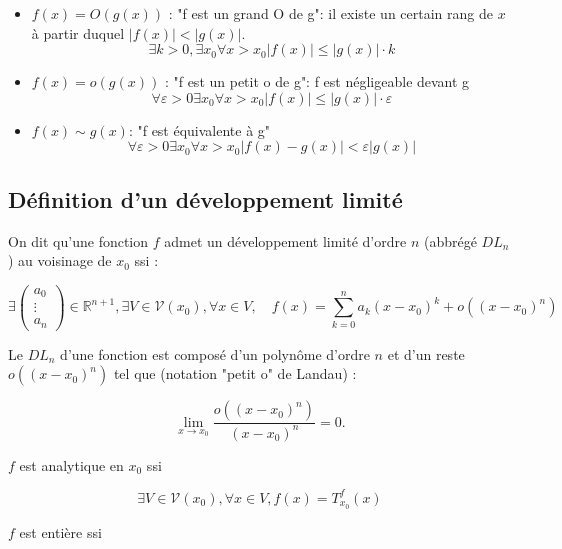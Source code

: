 \begin{itemize}
    \item $f(x) = O(g(x))$ : "f est un grand O de g": il existe un certain rang de $x$ à partir duquel $|f(x)| < |g(x)|$.
    $$\exists k>0, \exists x_0 \forall x>x_0|f(x)| \leq|g(x)| \cdot k$$
    \item $f(x) = o(g(x))$ : "f est un petit o de g": f est négligeable devant g
    $$\forall \varepsilon>0 \exists x_0 \forall x>x_0|f(x)| \leq|g(x)| \cdot \varepsilon$$
    \item $f(x) \sim g(x)$: "f est équivalente à g"
    $$\forall \varepsilon>0 \exists x_0 \forall x>x_0|f(x)-g(x)|<\varepsilon|g(x)|$$
\end{itemize}

\subsection{Définition d'un développement limité}
On dit qu'une fonction $f$ admet un développement limité d'ordre $n$ (abbrégé $D L_n$ ) au voisinage de $x_0$ ssi :

$$
\exists\left(\begin{array}{c}
a_0 \\
\vdots \\
a_n
\end{array}\right) \in \mathbb{R}^{n+1}, \exists V \in \mathcal{V}\left(x_0\right), \forall x \in V, \quad f(x)=\sum_{k=0}^n a_k\left(x-x_0\right)^k+o\left(\left(x-x_0\right)^n\right)
$$


Le $D L_n$ d'une fonction est composé d'un polynôme d'ordre $n$ et d'un reste $o\left(\left(x-x_0\right)^n\right)$ tel que (notation "petit o" de Landau) :

$$
\lim _{x \rightarrow x_0} \frac{o\left(\left(x-x_0\right)^n\right)}{\left(x-x_0\right)^n}=0 .
$$



$f$ est analytique en $x_0$ ssi

$$
\exists V \in \mathcal{V}\left(x_0\right), \forall x \in V, f(x)=T_{x_0}^f(x)
$$

$f$ est entière ssi


